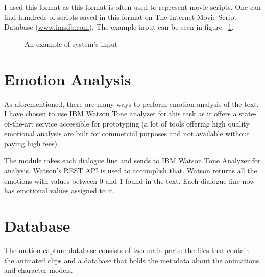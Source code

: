 I used this format as this format is often used to represent movie scripts. One can find hundreds of scripts saved in this format on The Internet Movie Script Database (\url{www.imsdb.com}). The example input can be seen in figure ~\ref{fig:inputscript}.


\begin{figure}[H]
\centerline{}
\caption{An example of system's input}\label{fig:inputscript}
\end{figure}


\section{Emotion Analysis} 
\label{sec:emoanal}
As aforementioned, there are many ways to perform emotion analysis of the text. I have chosen to use IBM Watson Tone analyzer for this task as it offers a state-of-the-art service accessible for prototyping (a lot of tools offering high quality emotional analysis are bult for commercial purposes and not available without paying high fees).

The module takes each dialogue line and sends to IBM Watson Tone Analyzer for analysis. Watson's REST API is used to accomplish that. Watson returns all the emotions with values between 0 and 1 found in the text. Each dialogue line now has emotional values assigned to it.

\section{Database}
\label{sec:dbdesign}

The motion capture database consists of two main parts: the files that contain the animated clips and a database that holds the metadata about the animations and character models.

